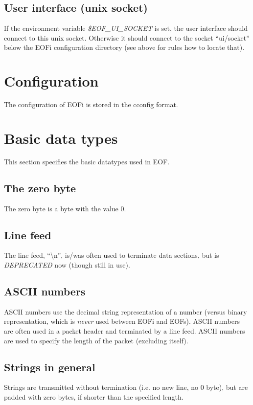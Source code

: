 \documentclass[12pt,a4paper]{book}
\begin{document}
\subsection{User interface (unix socket)}
\label{ui-socket}
If the environment variable \textit{\$EOF\_UI\_SOCKET} is set, the user
interface should connect to this unix socket. Otherwise it should connect
to the socket "`ui/socket"' below the EOFi configuration directory
(see above for rules how to locate that).
\section{Configuration}
The configuration of EOFi is stored in the cconfig\cite{cconfig} format.
\section{Basic data types}
This section specifies the basic datatypes used in EOF.
\subsection{The zero byte}
The zero byte is a byte with the value 0.
\subsection{Line feed}
The line feed, "`\textbackslash{}n"', is/was often used to terminate data
sections, but is \emph{DEPRECATED} now (though still in use).
\subsection{ASCII numbers}
ASCII numbers use the decimal string representation of a number (versus
binary representation, which is \emph{never} used between EOFi and EOFs).
ASCII numbers are often used in a packet header and terminated by a
line feed. ASCII numbers are used to specify the length of the packet
(excluding itself).
\subsection{Strings in general}
Strings are transmitted without termination (i.e. no new line, no 0 byte),
but are padded with zero bytes, if shorter than the specified length.
\end{document}
